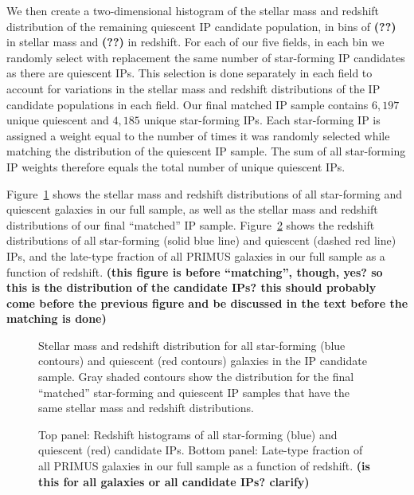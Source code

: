 We then create a two-dimensional histogram of the stellar mass and redshift distribution of the remaining quiescent IP candidate population, in bins of {\bf(??)} in stellar mass and {\bf(??)} in redshift.
For each of our five fields, in each bin we randomly select with replacement the same number of star-forming IP candidates as there are quiescent IPs.
This selection is done separately in each field to account for variations in the stellar mass and redshift distributions of the IP candidate populations in each field.
Our final matched IP sample contains $6,197$ unique quiescent and $4,185$ unique star-forming IPs.
Each star-forming IP is assigned a weight equal to the number of times it was randomly selected while matching the distribution of the quiescent IP sample.
The sum of all star-forming IP weights therefore equals the total number of unique quiescent IPs.

Figure~\ref{fig:IPsample_matched} shows the stellar mass  and redshift distributions of all star-forming and quiescent galaxies in our full sample, 
as well as the stellar mass and redshift distributions of our final ``matched'' IP sample.
Figure~\ref{fig:IPhist_latefrac_vs_z} shows the redshift distributions of all star-forming (solid blue line) and quiescent (dashed red line) IPs, and the late-type fraction of all PRIMUS galaxies in our full sample as a function of redshift.
{\bf(this figure is before ``matching'', though, yes?  so this is the distribution of the candidate IPs?  this should probably come before the previous figure and be discussed in the text before the matching is done)}

\begin{figure}
  \epstrim{0.6in 0.2in 0.2in 0.4in}
  \caption{Stellar mass and redshift distribution for all star-forming (blue contours) and quiescent (red contours) galaxies in the IP candidate sample. 
Gray shaded contours show the distribution for the final ``matched'' star-forming and quiescent IP samples that have the same stellar mass and redshift distributions.
}
  \label{fig:IPsample_matched}
\end{figure}

\begin{figure}
  \epstrim{0.1in 0.1in 0.5in 0.8in}
  \caption{Top panel: Redshift histograms of all star-forming (blue) and quiescent (red) candidate IPs.
Bottom panel: Late-type fraction of all PRIMUS galaxies in our full sample as a function of redshift. {\bf(is this for all galaxies or all candidate IPs? clarify)}
}
  \label{fig:IPhist_latefrac_vs_z}
\end{figure}

